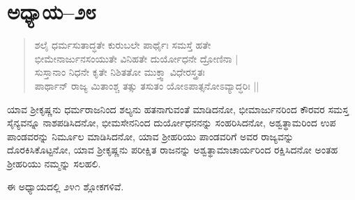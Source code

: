 \section{ಅಧ್ಯಾಯ–೨೮}

\begin{verse}
ಶಲೈ ಧರ್ಮಸುತಾದ್ಧತೇ ಕುರುಬಲೇ ಪಾರ್ಥೈಃ ಸಮಸ್ತೆ ಹತೇ\\ ಭೀಮೇನಾರ್ಜುನಸಂಯುತೇ ವಿನಿಹತೇ ದುರ್ಯೋಧನೇ ದ್ರೋಣಿನಾ |\\ ಸುಸ್ತಾನಾಂ ನಿಧನೇ ಕೃತೇ ನಿಶಿತತೋ ಮುಕ್ತ್ವಾ ವಿಧೇರಸ್ತ್ರತಃ\\ ಪಾರ್ಥಾನ್ ರಾಜ್ಯ ಮಿತಾಂಶ್ಚ ತತ್ಸು ತಸುತಂ ಯೋಽಪಾತ್ಸನೋಽವ್ಯಾದ್ಧರಿಃ ||
\end{verse}

ಯಾವ ಶ‍್ರೀಕೃಷ್ಣನು ಧರ್ಮರಾಜನಿಂದ ಶಲ್ಯನು ಹತನಾಗುವಂತೆ ಮಾಡಿದನೋ, ಭೀಮಾರ್ಜುನರಿಂದ ಕೌರವರ ಸಮಸ್ತ ಸೈನ್ಯವನ್ನೂ ನಾಶಪಡಿಸಿದನೋ, ಭೀಮಸೇನನಿಂದ ದುರ್ಯೋಧನನನ್ನು ಸಂಹರಿಸಿದನೋ, ಅಶ್ವತ್ಥಾಮರಿಂದ ಉಪ ಪಾಂಡವರನ್ನು ನಿರ್ಮೂಲ ಮಾಡಿಸಿದನೋ, ಯಾವ ಶ‍್ರೀಹರಿಯು ಪಾಂಡವರಿಗೆ ಅವರ ರಾಜ್ಯವನ್ನು ದೊರಕಿಸಿಕೊಟ್ಟನೋ, ಯಾವ ಶ‍್ರೀಕೃಷ್ಣನು ಪರೀಕ್ಷಿತ ರಾಜನನ್ನು ಅಶ್ವತ್ಥಾಮಾಚಾರ್ಯರಿಂದ ರಕ್ಷಿಸಿದನೋ ಅಂತಹ ಶ‍್ರೀಹರಿಯು ನಮ್ಮನ್ನು ಸಲಹಲಿ.

ಈ ಅಧ್ಯಾಯದಲ್ಲಿ ೨೪೧ ಶ್ಲೋಕಗಳಿವೆ.

